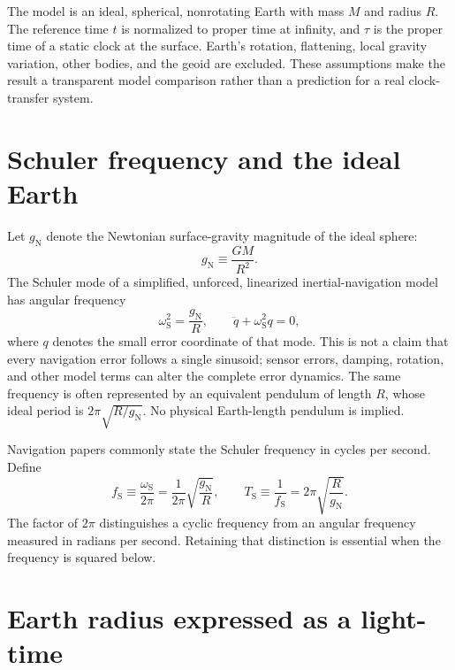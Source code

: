 \documentclass[12pt]{article}
\begin{document}
The model is an ideal, spherical, nonrotating Earth with mass $M$ and radius $R$. The reference time $t$ is normalized to proper time at infinity, and $\tau$ is the proper time of a static clock at the surface. Earth's rotation, flattening, local gravity variation, other bodies, and the geoid are excluded. These assumptions make the result a transparent model comparison rather than a prediction for a real clock-transfer system.

\section{Schuler frequency and the ideal Earth}

Let $g_{\mathrm{N}}$ denote the Newtonian surface-gravity magnitude of the ideal sphere:
\begin{equation}
  g_{\mathrm{N}}\equiv\frac{GM}{R^2}.
  \label{eq:newtonian-g}
\end{equation}
The Schuler mode of a simplified, unforced, linearized inertial-navigation model has angular frequency
\begin{equation}
  \omega_{\mathrm{S}}^2=\frac{g_{\mathrm{N}}}{R},
  \qquad
  \ddot{q}+\omega_{\mathrm{S}}^2q=0,
  \label{eq:schuler-mode}
\end{equation}
where $q$ denotes the small error coordinate of that mode. This is not a claim that every navigation error follows a single sinusoid; sensor errors, damping, rotation, and other model terms can alter the complete error dynamics. The same frequency is often represented by an equivalent pendulum of length $R$, whose ideal period is $2\pi\sqrt{R/g_{\mathrm{N}}}$. No physical Earth-length pendulum is implied.

Navigation papers commonly state the Schuler frequency in cycles per second. Define
\begin{equation}
  f_{\mathrm{S}}\equiv\frac{\omega_{\mathrm{S}}}{2\pi}
  =\frac{1}{2\pi}\sqrt{\frac{g_{\mathrm{N}}}{R}},
  \qquad
  T_{\mathrm{S}}\equiv\frac{1}{f_{\mathrm{S}}}
  =2\pi\sqrt{\frac{R}{g_{\mathrm{N}}}}.
  \label{eq:schuler-frequency}
\end{equation}
The factor of $2\pi$ distinguishes a cyclic frequency from an angular frequency measured in radians per second. Retaining that distinction is essential when the frequency is squared below.

\section{Earth radius expressed as a light-time}
\end{document}
